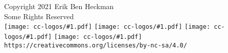 \newcommand\cclogo[1]{%
\texttt{[image: cc-logos/\#1.pdf]}%
}
\null\vfill
\begin{center}
\begin{footnotesize}
Copyright 2021 Erik Ben Heckman\\%
Some Rights Reserved\\[1ex]%
\cclogo{cc} \cclogo{by} \cclogo{nc} \cclogo{sa}\\[-0.5ex]%
\texttt{https://creativecommons.org/licenses/by-nc-sa/4.0/}
\end{footnotesize}
\end{center}
